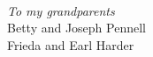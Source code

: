 \cleardoublepage
{}
{}
\vspace*{190pt}
\begingroup
\begin{center}
\large{}\\
\bigskip
\textit{To my grandparents}\\
Betty and Joseph Pennell\\
Frieda and Earl Harder
\end{center}
\endgroup
\vspace*{\fill}
